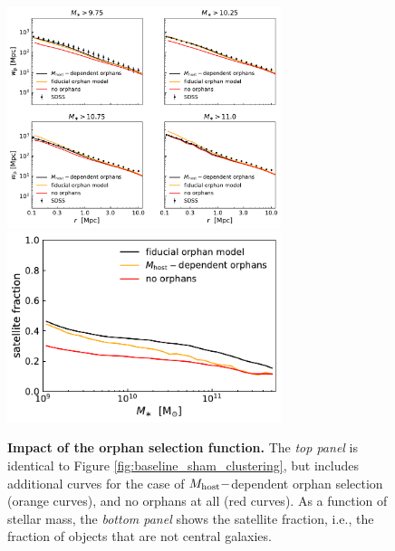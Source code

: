 \documentclass[usenatbib,usegraphicx,letterpaper]{mn2e}
\begin{document}
\begin{figure}
\centering
\includegraphics[width=8cm]{FIGS/baseline_sham_orphans.pdf}
\includegraphics[width=8cm]{FIGS/orphan_satellite_fraction.pdf}
\caption{
{\bf Impact of the orphan selection function.} The {\em top panel} is identical to Figure \ref{fig:baseline_sham_clustering}, but includes additional curves for the case of $M_{\rm host}-$dependent orphan selection (orange curves), and no orphans at all (red curves). As a function of stellar mass, the {\em bottom panel} shows the satellite fraction, i.e., the fraction of objects that are not central galaxies.
}
\label{fig:orphan_effects}
\end{figure}
\end{document}

